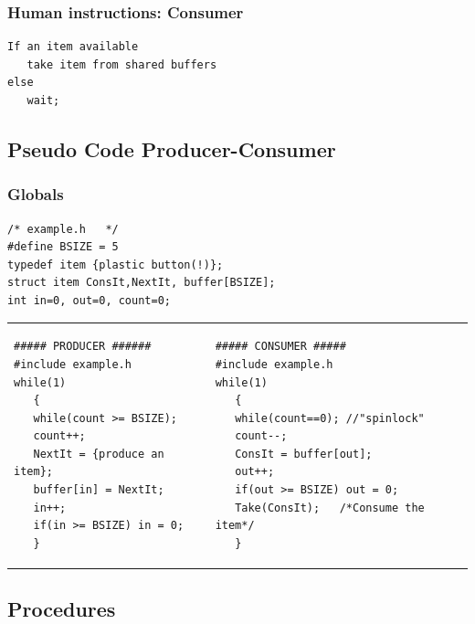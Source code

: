 \documentclass{article}	%
\begin{document}
\subsubsection{Human instructions: Consumer }
\begin{verbatim}
If an item available
   take item from shared buffers
else
   wait;
\end{verbatim}




\subsection{Pseudo Code Producer-Consumer}
\subsubsection{ Globals }
\begin{verbatim}
/* example.h   */
#define BSIZE = 5
typedef item {plastic button(!)};
struct item ConsIt,NextIt, buffer[BSIZE];
int in=0, out=0, count=0;
\end{verbatim}



\begin{tabular}{p{2in}p{2in}}

\begin{verbatim}
##### PRODUCER ######
#include example.h
while(1)
   {
   while(count >= BSIZE);
   count++;
   NextIt = {produce an item};
   buffer[in] = NextIt;
   in++;
   if(in >= BSIZE) in = 0;
   }
\end{verbatim}

&

\begin{verbatim}
##### CONSUMER #####
#include example.h
while(1)
   {
   while(count==0); //"spinlock"
   count--;
   ConsIt = buffer[out];
   out++;
   if(out >= BSIZE) out = 0;
   Take(ConsIt);   /*Consume the item*/
   }
\end{verbatim}
\end{tabular}


\subsection{Procedures}
\end{document}
